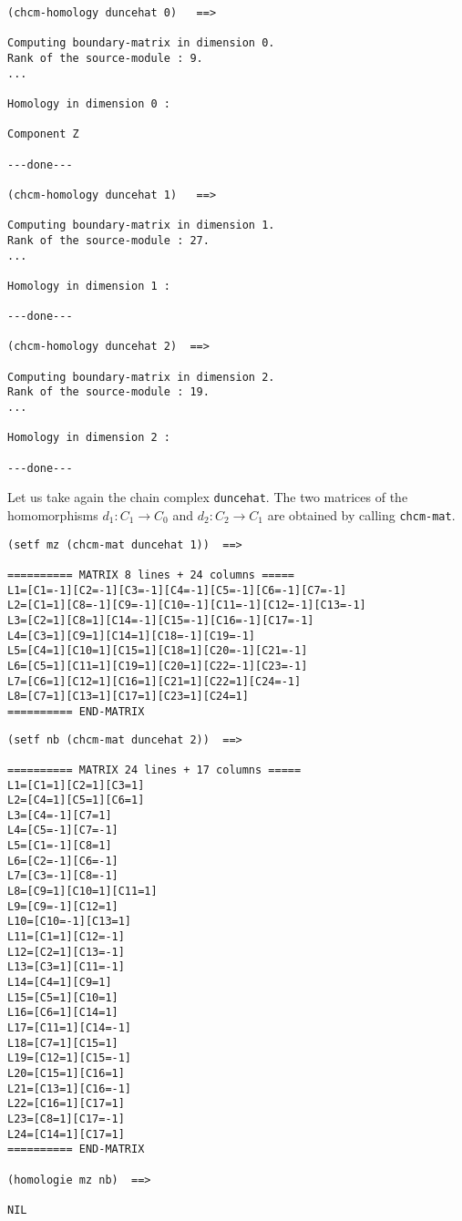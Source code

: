 \newpage
{\footnotesize\begin{verbatim}
(chcm-homology duncehat 0)   ==>

Computing boundary-matrix in dimension 0.
Rank of the source-module : 9.
...

Homology in dimension 0 :

Component Z

---done---

(chcm-homology duncehat 1)   ==>

Computing boundary-matrix in dimension 1.
Rank of the source-module : 27.
...

Homology in dimension 1 :

---done---

(chcm-homology duncehat 2)  ==>

Computing boundary-matrix in dimension 2.
Rank of the source-module : 19.
...

Homology in dimension 2 :

---done---
\end{verbatim}}

Let us take again  the chain complex {\tt duncehat}.
The two matrices of the homomorphisms $d_1: C_1 \rightarrow C_0$ and
$d_2: C_2 \rightarrow C_1$ are obtained by calling {\tt chcm-mat}.
{\footnotesize\begin{verbatim}
(setf mz (chcm-mat duncehat 1))  ==>

========== MATRIX 8 lines + 24 columns =====
L1=[C1=-1][C2=-1][C3=-1][C4=-1][C5=-1][C6=-1][C7=-1]
L2=[C1=1][C8=-1][C9=-1][C10=-1][C11=-1][C12=-1][C13=-1]
L3=[C2=1][C8=1][C14=-1][C15=-1][C16=-1][C17=-1]
L4=[C3=1][C9=1][C14=1][C18=-1][C19=-1]
L5=[C4=1][C10=1][C15=1][C18=1][C20=-1][C21=-1]
L6=[C5=1][C11=1][C19=1][C20=1][C22=-1][C23=-1]
L7=[C6=1][C12=1][C16=1][C21=1][C22=1][C24=-1]
L8=[C7=1][C13=1][C17=1][C23=1][C24=1]
========== END-MATRIX
\end{verbatim}}
\newpage
{\footnotesize\begin{verbatim}
(setf nb (chcm-mat duncehat 2))  ==>

========== MATRIX 24 lines + 17 columns =====
L1=[C1=1][C2=1][C3=1]
L2=[C4=1][C5=1][C6=1]
L3=[C4=-1][C7=1]
L4=[C5=-1][C7=-1]
L5=[C1=-1][C8=1]
L6=[C2=-1][C6=-1]
L7=[C3=-1][C8=-1]
L8=[C9=1][C10=1][C11=1]
L9=[C9=-1][C12=1]
L10=[C10=-1][C13=1]
L11=[C1=1][C12=-1]
L12=[C2=1][C13=-1]
L13=[C3=1][C11=-1]
L14=[C4=1][C9=1]
L15=[C5=1][C10=1]
L16=[C6=1][C14=1]
L17=[C11=1][C14=-1]
L18=[C7=1][C15=1]
L19=[C12=1][C15=-1]
L20=[C15=1][C16=1]
L21=[C13=1][C16=-1]
L22=[C16=1][C17=1]
L23=[C8=1][C17=-1]
L24=[C14=1][C17=1]
========== END-MATRIX

(homologie mz nb)  ==>

NIL
\end{verbatim}}
\newpage

